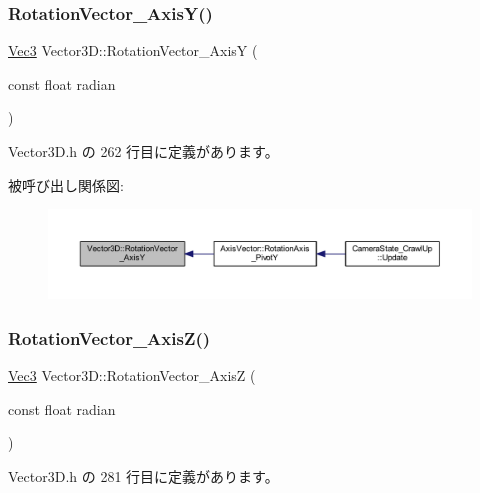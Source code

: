 \subsubsection{\texorpdfstring{Rotation\+Vector\+\_\+\+Axis\+Y()}{RotationVector\_AxisY()}}
{\footnotesize\ttfamily \mbox{\hyperlink{_vector3_d_8h_ab16f59e4393f29a01ec8b9bbbabbe65d}{Vec3}} Vector3\+D\+::\+Rotation\+Vector\+\_\+\+AxisY (\begin{DoxyParamCaption}\item[{const float}]{radian }\end{DoxyParamCaption})\hspace{0.3cm}{\ttfamily [inline]}}



 Vector3\+D.\+h の 262 行目に定義があります。

被呼び出し関係図\+:
\nopagebreak
\begin{figure}[H]
\begin{center}
\leavevmode
\includegraphics[width=350pt]{class_vector3_d_a0a8556c9bd5caef8592174a8c095080f_icgraph}
\end{center}
\end{figure}
\mbox{\label{class_vector3_d_ac893f738dde87e5981dcff5d5515ede6}} 
\subsubsection{\texorpdfstring{Rotation\+Vector\+\_\+\+Axis\+Z()}{RotationVector\_AxisZ()}}
{\footnotesize\ttfamily \mbox{\hyperlink{_vector3_d_8h_ab16f59e4393f29a01ec8b9bbbabbe65d}{Vec3}} Vector3\+D\+::\+Rotation\+Vector\+\_\+\+AxisZ (\begin{DoxyParamCaption}\item[{const float}]{radian }\end{DoxyParamCaption})\hspace{0.3cm}{\ttfamily [inline]}}



 Vector3\+D.\+h の 281 行目に定義があります。

